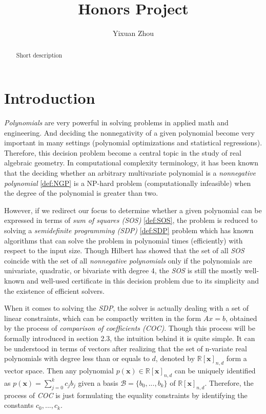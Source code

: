 \documentclass[12pt]{amsart}
\title{Honors Project}
\author{Yixuan Zhou} %
\numberwithin{equation}{section}
\theoremstyle{definition}
\numberwithin{thm}{section}
\begin{document}
 

\begin{abstract}
Short description
\end{abstract}

\maketitle


\section{Introduction} 

\emph{Polynomials} are very powerful in solving problems in applied math and engineering. 
And deciding the nonnegativity of a given polynomial become very important in many settings (polynomial optimizations and statistical regressions). 
Therefore, this decision problem become a central topic in the study of real algebraic geometry. 
In computational complexity terminology, it has been known that the deciding whether an arbitrary multivariate polynomial is a \emph{nonnegative polynomial} \ref{def:NGP} is a NP-hard problem (computationally infeasible) when the 
degree of the polynomial is greater than two. 

However, if we redirect our focus to determine whether a given polynomial can be expressed in terms of \emph{sum of squares (SOS)} \ref{def:SOS},
the problem is reduced to solving a \emph{semidefinite programming (SDP)} \ref{def:SDP} problem which 
has known algorithms that can solve the problem in polynomial times (efficiently) with respect to the input size. 
Though Hilbert has showed that the set of all \emph{SOS} coincide with the set of all \emph{nonnegative polynomials} only if the polynomials are univariate, quadratic, or bivariate with degree 4,
the \emph{SOS} is still the mostly well-known and well-used certificate in this decision problem due to its simplicity and the existence of efficient solvers. \cite{Blekherman:Parrilo:Thomas}

When it comes to solving the \emph{SDP}, the solver is actually dealing with a set of linear constraints, which can be compactly written in the form $Ax = b$, obtained by the process of \emph{comparison of coefficients (COC)}.
Though this process will be formally introduced in section 2.3, the intuition behind it is quite simple. 
It can be understood in terms of vectors after realizing that the set of n-variate real polynomials with degree less than or equals to $d$, denoted by $\mathbb{R}[\mathbf{x}]_{n, d}$ form a vector space.
Then any polynomial $p(\mathbf{x}) \in \mathbb{R}[\mathbf{x}]_{n, d}$ can be uniquely identified as $p(\mathbf{x}) = \sum_{j = 0}^k c_j b_j$ given a basis $\mathcal{B} = \{b_0, ..., b_k\}$ of $\mathbb{R}[\mathbf{x}]_{n, d}$.
Therefore, the process of \emph{COC} is just formulating the equality constraints by identifying the constants $c_0, ..., c_k$. \cite{Recher:Masterthesis}
\end{document}
